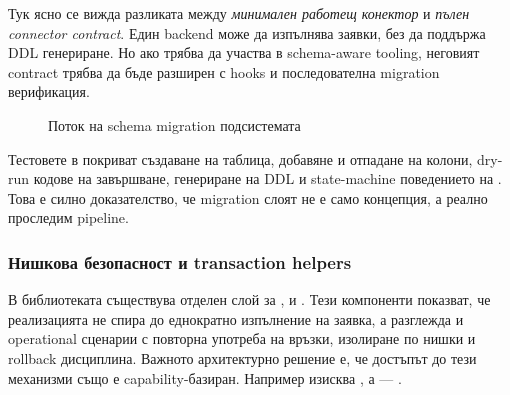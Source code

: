 Тук ясно се вижда разликата между \emph{минимален работещ конектор} и \emph{пълен connector contract}. Един backend може да изпълнява заявки, без да поддържа DDL генериране. Но ако трябва да участва в schema-aware tooling, неговият contract трябва да бъде разширен с  hooks и последователна migration верификация.

\begin{figure}[H]
\centering
{}
\caption{Поток на schema migration подсистемата}
\label{fig:migration_pipeline}
\end{figure}

Тестовете в  покриват създаване на таблица, добавяне и отпадане на колони, dry-run кодове на завършване, генериране на DDL и state-machine поведението на . Това е силно доказателство, че migration слоят не е само концепция, а реално проследим pipeline.

\subsubsection{Нишкова безопасност и transaction helpers}

В библиотеката съществува отделен слой за ,  и . Тези компоненти показват, че реализацията не спира до еднократно изпълнение на заявка, а разглежда и operational сценарии с повторна употреба на връзки, изолиране по нишки и rollback дисциплина. Важното архитектурно решение е, че достъпът до тези механизми също е capability-базиран. Например  изисква , а  --- .

